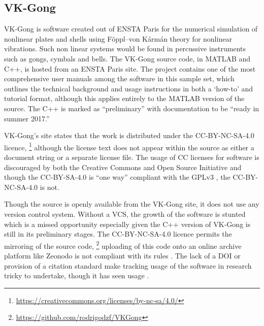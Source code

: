 \subsection{VK-Gong}

VK-Gong is software created out of ENSTA Paris for the numerical simulation of nonlinear plates and shells using Föppl–von Kármán theory for nonlinear vibrations. Such non linear systems would be found in percussive instruments such as gongs, cymbals and bells.  The VK-Gong source code, in MATLAB and C\textsc{++}, is hosted from an ENSTA Paris site. The project contains one of the most comprehensive user manuals \cite{vkgong_manual_2017} among the  software in this sample set, which outlines the technical background and usage instructions in both a `how-to' and tutorial format, although this applies entirely to the MATLAB version of the source. The C\textsc{++} is marked as ``preliminary'' with documentation to be ``ready in summer 2017.''

VK-Gong's site states that the work is distributed under the CC-BY-NC-SA-4.0 licence,
\footnote{\url{https://creativecommons.org/licenses/by-nc-sa/4.0/}}
although the license text does not appear within the source as either a document string or a separate license file. The usage of CC licenses for software is discouraged by both the Creative Commons and Open Source Initiative and though the CC-BY-SA-4.0 is ``one way'' compliant with the GPLv3 \cite{cc_can_2025}, the CC-BY-NC-SA-4.0 is not.

Though the source is openly available from the VK-Gong site, it does not use any version control system. Without a VCS, the growth of the software is stunted which is a missed opportunity especially given the C\textsc{++} version of VK-Gong is still in its preliminary stages. The CC-BY-NC-SA-4.0 licence permits the mirroring of the source code,
\footnote{\url{https://github.com/rodrigodzf/VKGong}}
uploading of this code onto an online archive platform like Zeonodo is not compliant with its rules \cite{zenodo_metadata_2025}. 
The lack of a DOI or provision of a citation standard make tracking usage of the software in research tricky to undertake, though it has seen usage \cite{nguyen_nonlinear_2019}.

